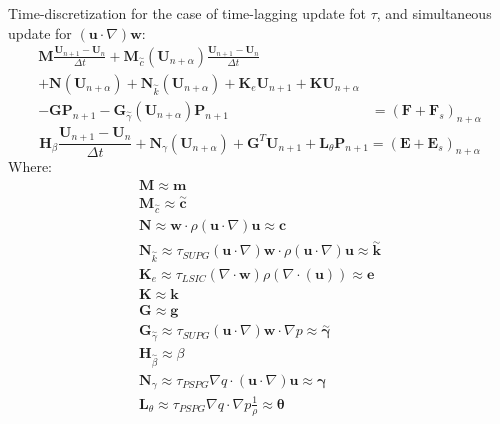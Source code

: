 \documentclass[a4paper,10pt]{book}
\begin{document}
    Time-discretization for the case of time-lagging update fot $\tau$,
    and simultaneous update for $\left(\mathbf{u}\cdot\nabla\right)\mathbf{w}$:
    \begin{equation}
    \begin{split}
    \mathbf{M}\frac{\mathbf{U}_{n+1}-\mathbf{U}_n}{\Delta{t}}
    +\mathbf{M}_{\stackrel{\sim}{c}}\left(\mathbf{U}_{n+\alpha}\right)
    \frac{\mathbf{U}_{n+1}-\mathbf{U}_n}{\Delta{t}} & \\
    +\mathbf{N}\left(\mathbf{U}_{n+\alpha}\right)
    +\mathbf{N}_{\stackrel{\sim}{k}}\left(\mathbf{U}_{n+\alpha}\right)
    +\mathbf{K}_e\mathbf{U}_{n+1}+\mathbf{K}\mathbf{U}_{n+\alpha} & \\
    -\mathbf{G}\mathbf{P}_{n+1}-\mathbf{G}_{\stackrel{\sim}{\gamma}}\left(\mathbf{U}_{n+\alpha}\right)\mathbf{P}_{n+1}&=\left(\mathbf{F}+\mathbf{F}_s\right)_{n+\alpha}
    \end{split}
    \end{equation}
    \begin{equation}
    \mathbf{H}_\beta\frac{\mathbf{U}_{n+1}-\mathbf{U}_n}{\Delta{t}}
    +\mathbf{N}_\gamma\left(\mathbf{U}_{n+\alpha}\right)
    +\mathbf{G}^T\mathbf{U}_{n+1}+\mathbf{L}_\theta\mathbf{P}_{n+1}
    =\left(\mathbf{E}+\mathbf{E}_s\right)_{n+\alpha}
    \end{equation}
    Where:
    \begin{eqnarray*}
    & \mathbf{M}\approx\mathbf{m} & \\
    & \mathbf{M}_{\stackrel{\sim}{c}}\approx\mathbf{\stackrel{\sim}{c}} & \\
    & \mathbf{N}\approx\mathbf{w}\cdot\rho\left(\mathbf{u}\cdot\nabla\right)\mathbf{u}\approx\mathbf{c} & \\
    & \mathbf{N}_{\stackrel{\sim}{k}}\approx\tau_{SUPG}\left(\mathbf{u}\cdot\nabla\right)\mathbf{w}\cdot\rho\left(\mathbf{u}\cdot\nabla\right)\mathbf{u}\approx\mathbf{\stackrel{\sim}{k}} & \\
    & \mathbf{K}_e\approx\tau_{LSIC}\left(\nabla\cdot\mathbf{w}\right)\rho\left(\nabla\cdot\left(\mathbf{u}\right)\right)\approx\mathbf{e} & \\
    & \mathbf{K}\approx\mathbf{k} & \\
    & \mathbf{G}\approx\mathbf{g} & \\
    & \mathbf{G}_{\stackrel{\sim}{\gamma}}\approx\tau_{SUPG}\left(\mathbf{u}\cdot\nabla\right)\mathbf{w}\cdot\nabla{p}\approx\boldsymbol{\stackrel{\sim}{\gamma}} & \\
    & \mathbf{H}_{\stackrel{\sim}{\beta}}\approx\beta & \\
    & \mathbf{N}_\gamma\approx\tau_{PSPG}\nabla{q}\cdot\left(\mathbf{u}\cdot\nabla\right)\mathbf{u}\approx\boldsymbol{\gamma} & \\
    & \mathbf{L}_\theta\approx\tau_{PSPG}\nabla{q}\cdot\nabla{p}\frac{1}{\rho}\approx\boldsymbol\theta
    \end{eqnarray*}
\end{document}
